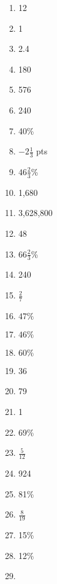 \documentclass[../uilmath.tex]{subfiles}
\begin{document}
\begin{enumerate}[label=\bfseries\arabic*.]
    \item %
    12

    \item %
    1

    \item %
    2.4

    \item %
    180

    \item %
    576

    \item %
    240

    \item %
    40\%

    \item %
    $-2\frac{1}{3}$ pts 

    \item %
    $46\frac{2}{3}$\% 

    \item %
    1,680 

    \item %
    3,628,800

    \item %
    48 

    \item %
    $66\frac{2}{3}$\%

    \item %
    240

    \item %
    $\frac{2}{7}$

    \item %
    $47\%$

    \item %
    $46\%$

    \item %
    $60\%$

    \item %
    36 

    \item %
    79

    \item %
    1

    \item %
    69\%

    \item %
    $\frac{5}{12}$

    \item %
    924

    \item %
    81\%

    \item %
    $\frac{8}{19}$

    \item %
    15\%

    \item %
    12\%

    \item %
    
\end{enumerate}
\end{document}
